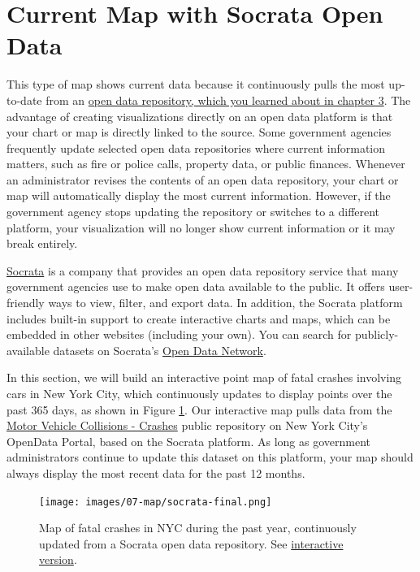 \documentclass[
  english,
]{book}
\begin{document}
\hypertarget{map-socrata}{%
\section*{Current Map with Socrata Open Data}\label{map-socrata}}

This type of map shows current data because it continuously pulls the most up-to-date from an \href{opendata.html}{open data repository, which you learned about in chapter 3}. The advantage of creating visualizations directly on an open data platform is that your chart or map is directly linked to the source. Some government agencies frequently update selected open data repositories where current information matters, such as fire or police calls, property data, or public finances. Whenever an administrator revises the contents of an open data repository, your chart or map will automatically display the most current information. However, if the government agency stops updating the repository or switches to a different platform, your visualization will no longer show current information or it may break entirely.

\href{https://www.tylertech.com/products/socrata}{Socrata} is a company that provides an open data repository service that many government agencies use to make open data available to the public. It offers user-friendly ways to view, filter, and export data. In addition, the Socrata platform includes built-in support to create interactive charts and maps, which can be embedded in other websites (including your own). You can search for publicly-available datasets on Socrata's \href{https://www.opendatanetwork.com/}{Open Data Network}.

In this section, we will build an interactive point map of fatal crashes involving cars in New York City, which continuously updates to display points over the past 365 days, as shown in Figure \ref{fig:socrata-final}. Our interactive map pulls data from the \href{https://data.cityofnewyork.us/Public-Safety/Motor-Vehicle-Collisions-Crashes/h9gi-nx95/data}{Motor Vehicle Collisions - Crashes} public repository on New York City's OpenData Portal, based on the Socrata platform. As long as government administrators continue to update this dataset on this platform, your map should always display the most recent data for the past 12 months.



\begin{figure}
\centering
\texttt{[image: images/07-map/socrata-final.png]}
\caption{\label{fig:socrata-final}Map of fatal crashes in NYC during the past year, continuously updated from a Socrata open data repository. See \href{https://data.cityofnewyork.us/dataset/Fatal-NYC-Crashes/nx4u-jy9t/embed?width=100\%25\&height=500}{interactive version}.}
\end{figure}
\end{document}

